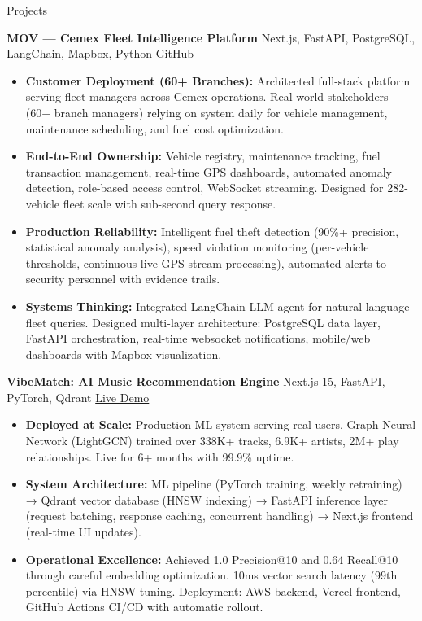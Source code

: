 \documentclass{resume}
\begin{document}
\begin{rSection}{Projects}

\textbf{MOV — Cemex Fleet Intelligence Platform} {Next.js, FastAPI, PostgreSQL, LangChain, Mapbox, Python} \hfill \href{https://github.com/Fraga9/MOV-fleet}{GitHub}
\begin{itemize}
    \item \textbf{Customer Deployment (60+ Branches):} Architected full-stack platform serving fleet managers across Cemex operations. Real-world stakeholders (60+ branch managers) relying on system daily for vehicle management, maintenance scheduling, and fuel cost optimization.
    \item \textbf{End-to-End Ownership:} Vehicle registry, maintenance tracking, fuel transaction management, real-time GPS dashboards, automated anomaly detection, role-based access control, WebSocket streaming. Designed for 282-vehicle fleet scale with sub-second query response.
    \item \textbf{Production Reliability:} Intelligent fuel theft detection (90\%+ precision, statistical anomaly analysis), speed violation monitoring (per-vehicle thresholds, continuous live GPS stream processing), automated alerts to security personnel with evidence trails.
    \item \textbf{Systems Thinking:} Integrated LangChain LLM agent for natural-language fleet queries. Designed multi-layer architecture: PostgreSQL data layer, FastAPI orchestration, real-time websocket notifications, mobile/web dashboards with Mapbox visualization.
\end{itemize}

\textbf{VibeMatch: AI Music Recommendation Engine} {Next.js 15, FastAPI, PyTorch, Qdrant} \hfill \href{https://www.vibematchs.me/}{Live Demo}
\begin{itemize}
    \item \textbf{Deployed at Scale:} Production ML system serving real users. Graph Neural Network (LightGCN) trained over 338K+ tracks, 6.9K+ artists, 2M+ play relationships. Live for 6+ months with 99.9\% uptime.
    \item \textbf{System Architecture:} ML pipeline (PyTorch training, weekly retraining) → Qdrant vector database (HNSW indexing) → FastAPI inference layer (request batching, response caching, concurrent handling) → Next.js frontend (real-time UI updates).
    \item \textbf{Operational Excellence:} Achieved 1.0 Precision@10 and 0.64 Recall@10 through careful embedding optimization. 10ms vector search latency (99th percentile) via HNSW tuning. Deployment: AWS backend, Vercel frontend, GitHub Actions CI/CD with automatic rollout.
\end{itemize}


\end{rSection}
\end{document}
